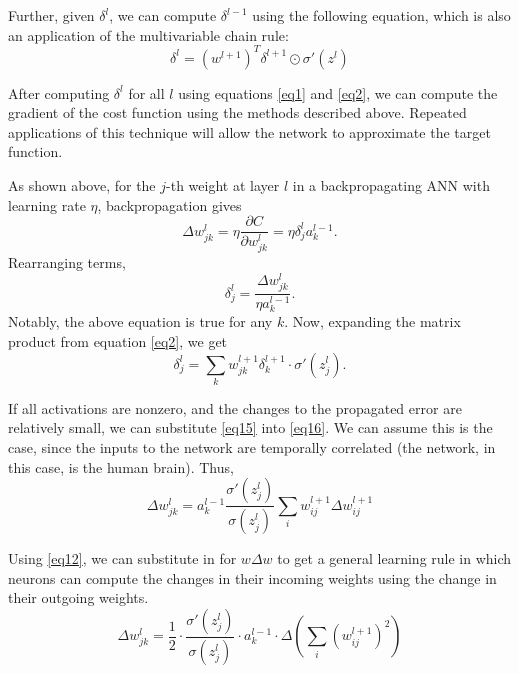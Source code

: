 \documentclass[12pt]{article}
\newcommand{\partialderiv}[2]{\frac{\partial #1}{\partial #2}}
\begin{document}
Further, given $\delta^l$, we can compute $\delta^{l-1}$ using the following equation, which is also an application of the multivariable chain rule:
\begin{equation}
	\delta^l = \left(w^{l+1}\right)^T\delta^{l+1}\odot\sigma'\left(z^l\right)\label{eq2}
\end{equation}

After computing $\delta^l$ for all $l$ using equations \ref{eq1} and \ref{eq2}, we can compute the gradient of the cost function using the methods described above. Repeated applications of this technique will allow the network to approximate the target function.

As shown above, for the $j$-th weight at layer $l$ in a backpropagating ANN with learning rate $\eta$, backpropagation gives
\begin{equation}
	\Delta w_{jk}^l = \eta\partialderiv{C}{w_{jk}^l} = \eta\delta_{j}^l a_k^{l-1}.\label{eq15.5}
\end{equation}
Rearranging terms,
\begin{equation}
	\delta_j^l = \frac{\Delta w_{jk}^l}{\eta a_k^{l-1}}\label{eq15}.
\end{equation}
Notably, the above equation is true for any $k$. Now, expanding the matrix product from equation \ref{eq2}, we get
\begin{equation}
	\delta_j^l = \sum_k w_{jk}^{l+1} \delta_k^{l+1}\cdot\sigma'\left(z_j^l\right)\label{eq16}.
\end{equation}

If all activations are nonzero, and the changes to the propagated error are relatively small, we can substitute \ref{eq15} into \ref{eq16}. We can assume this is the case, since the inputs to the network are temporally correlated (the network, in this case, is the human brain). Thus,
\begin{equation}
	\Delta w_{jk}^l = a_k^{l-1}\frac{\sigma'\left(z_j^l\right)}{\sigma\left(z_j^l\right)}\sum_i w_{ij}^{l+1}\Delta w_{ij}^{l+1}
\end{equation}

Using \ref{eq12}, we can substitute in for $w\Delta w$ to get a general learning rule in which neurons can compute the changes in their incoming weights using the change in their outgoing weights.
\begin{equation}
	\Delta w_{jk}^l = \frac{1}{2}\cdot \frac{\sigma'\left(z_j^l\right)}{\sigma\left(z_j^l\right)}\cdot a_k^{l-1}\cdot\Delta\left(\sum_i \left(w_{ij}^{l+1}\right)^2\right)\label{eq17}
\end{equation}
\end{document}
